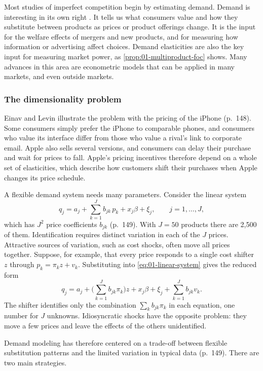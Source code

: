 Most studies of imperfect competition begin by estimating demand. Demand is interesting in its own right
\citep[p.~148]{EinavLevin2010}. It tells us what consumers value and how they substitute between products
as prices or product offerings change. It is the input for the welfare effects of mergers and new products,
and for measuring how information or advertising affect choices. Demand elasticities are also the key input
for measuring market power, as \cref{prop:01-multiproduct-foc} shows. Many advances in this area are
econometric models that can be applied in many markets, and even outside markets.

\subsubsection{The dimensionality problem}

Einav and Levin illustrate the problem with the pricing of the iPhone (p.~148). Some consumers simply prefer
the iPhone to comparable phones, and consumers who value its interface differ from those who value a rival's
link to corporate email. Apple also sells several versions, and consumers can delay their purchase and wait
for prices to fall. Apple's pricing incentives therefore depend on a whole set of elasticities, which
describe how customers shift their purchases when Apple changes its price schedule.

A flexible demand system needs many parameters. Consider the linear system
\begin{equation}\label{eq:01-linear-system}
  q_j = a_j + \sum_{k=1}^{J} b_{jk}\, p_k + x_j \beta + \xi_j, \qquad j = 1, \dots, J,
\end{equation}
which has $J^2$ price coefficients $b_{jk}$ (p.~149). With $J = 50$ products there are 2,500 of them.
Identification requires distinct variation in each of the $J$ prices. Attractive sources of variation, such
as cost shocks, often move all prices together. Suppose, for example, that every price responds to a single
cost shifter $z$ through $p_k = \pi_k z + v_k$. Substituting into \eqref{eq:01-linear-system} gives the
reduced form
\[
  q_j = a_j + \Big(\sum_{k=1}^{J} b_{jk}\pi_k\Big) z + x_j\beta + \xi_j + \sum_{k=1}^{J} b_{jk} v_k .
\]
The shifter identifies only the combination $\sum_k b_{jk}\pi_k$ in each equation, one number for $J$
unknowns. Idiosyncratic shocks have the opposite problem: they move a few prices and leave the effects of the
others unidentified.

Demand modeling has therefore centered on a trade-off between flexible substitution patterns and the limited
variation in typical data (p.~149). There are two main strategies.

